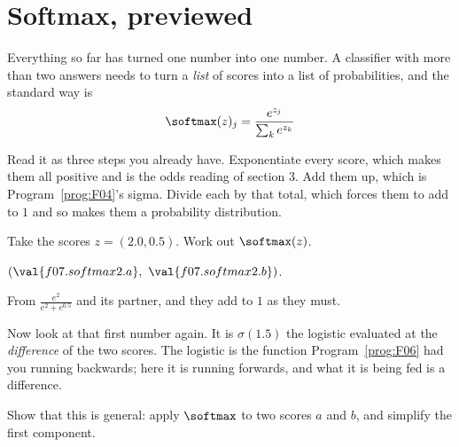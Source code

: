 \section{Softmax, previewed}
\label{sec:F07-softmax}

\begin{fr}
Everything so far has turned one number into one number. A classifier with
more than two answers needs to turn a \emph{list} of scores into a list of
probabilities, and the standard way is
\[ \softmax(z)_j = \frac{e^{z_j}}{\sum_k e^{z_k}} \]

Read it as three steps you already have. Exponentiate every score, which makes
them all positive and is the odds reading of section 3. Add them up, which is
Program~\ref{prog:F04}'s sigma. Divide each by that total, which forces them to
add to $1$ and so makes them a probability distribution.

Take the scores $z = (\num{2.0}, \num{0.5})$. Work out $\softmax(z)$.
\nextframe
\end{fr}

\begin{fr}
\begin{ansblock}
$(\val{f07.softmax2.a},\ \val{f07.softmax2.b})$.
\end{ansblock}

From $\frac{e^{2}}{e^{2} + e^{\num{0.5}}}$ and its partner, and they add to $1$ as
they must.

Now look at that first number again. It is $\sigma(\num{1.5})$ \dash{} the
logistic evaluated at the \emph{difference} of the two scores. The logistic is
the function Program~\ref{prog:F06} had you running backwards; here it is
running forwards, and what it is being fed is a difference.

Show that this is general: apply $\softmax$ to two scores $a$ and $b$, and
simplify the first component.
\nextframe
\end{fr}

